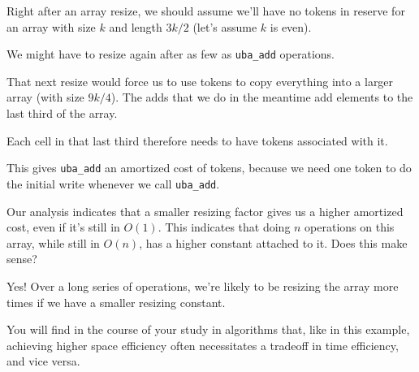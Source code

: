 \newpage
{}

Right after an array resize, we should assume we'll have no tokens in
reserve for an array with size $k$ and length $3k/2$ (let's assume $k$
is even).

We might have to resize again after as few as
 \lstinline'uba_add'
operations.

That next resize would force us to use
 tokens to copy
everything into a larger array (with size $9k/4$).  The adds that we
do in the meantime add elements to the last third of the array.

Each cell in that last third therefore needs to have
 tokens associated with it.

This gives \lstinline'uba_add' an amortized cost of
 tokens, because we
need one token to do the initial write whenever we call
\lstinline'uba_add'.



Our analysis indicates that a smaller resizing factor gives us a
higher amortized cost, even if it's still in $O(1)$. This indicates
that doing $n$ operations on this array, while still in $O(n)$, has a
higher constant attached to it. Does this make sense?

\answerline{}

\answerline{}

\answerline{}

\begin{solution}
Yes! Over a long series of operations, we're likely to be resizing the array more times if we have a smaller resizing constant.
\end{solution}

You will find in the course of your study in algorithms that, like in
this example, achieving higher space efficiency often necessitates a
tradeoff in time efficiency, and vice versa.